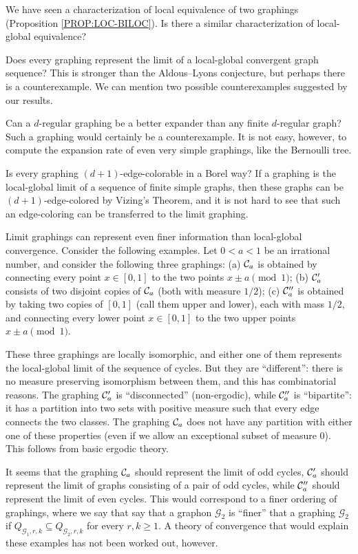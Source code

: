 \documentclass{article}
\def\GG{\mathcal{G}}\def\HH{\mathcal{H}}\def\II{\mathcal{I}}
\begin{document}
 We
have seen a characterization of local equivalence of two graphings
(Proposition \ref{PROP:LOC-BILOC}). Is there a similar
characterization of local-global equivalence?

Does every graphing represent the limit of a local-global convergent
graph sequence? This is stronger than the Aldous--Lyons conjecture,
but perhaps there is a counterexample. We can mention two possible
counterexamples suggested by our results.

Can a $d$-regular graphing be a better expander than any finite
$d$-regular graph? Such a graphing would certainly be a
counterexample. It is not easy, however, to compute the expansion
rate of even very simple graphings, like the Bernoulli tree.

Is every graphing $(d+1)$-edge-colorable in a Borel way? If a
graphing is the local-global limit of a sequence of finite {simple}
graphs, then these graphs can be $(d+1)$-edge-colored by Vizing's
Theorem, and it is not hard to see that such an edge-coloring can be
transferred to the limit graphing.

\medskip

 Limit graphings can
represent even finer information than local-global convergence.
Consider the following examples. Let $0<a<1$ be an irrational number,
and consider the following three graphings: (a) $\mathcal{C}_a$ is obtained
by connecting every point $x\in[0,1]$ to the two points $x\pm
a\pmod1$; (b) $\mathcal{C}_a'$ consists of two disjoint copies of $\mathcal{C}_a$
(both with measure $1/2$); (c) $\mathcal{C}_a''$ is obtained by taking two
copies of $[0,1]$ (call them upper and lower), each with mass $1/2$,
and connecting every lower point $x\in[0,1]$ to the two upper points
$x\pm a\pmod1$.

These three graphings are locally isomorphic, and either one of them
represents the local-global limit of the sequence of cycles. But they
are ``different'': there is no measure preserving isomorphism between
them, and this has combinatorial reasons. The graphing $\mathcal{C}_a'$ is
``disconnected'' (non-ergodic), while $\mathcal{C}_a''$ is ``bipartite'': it
has a partition into two sets with positive measure such that every
edge connects the two classes. The graphing $\mathcal{C}_a$ does not have any
partition with either one of these properties (even if we allow an
exceptional subset of measure $0$). This follows from basic ergodic
theory.

It seems that the graphing $\mathcal{C}_a$ should represent the limit of odd
cycles, $\mathcal{C}'_a$ should represent the limit of graphs consisting of a
pair of odd cycles, while $\mathcal{C}''_a$ should represent the limit of
even cycles. This would correspond to a finer ordering of graphings,
where we say that say that a graphon $\GG_2$ is ``finer'' that a
graphing $\GG_2$ if $Q_{\GG_1,r,k}\subseteq Q_{\GG_2,r,k}$ for every
$r,k\ge1$. A theory of convergence that would explain these examples
has not been worked out, however.
\end{document}
